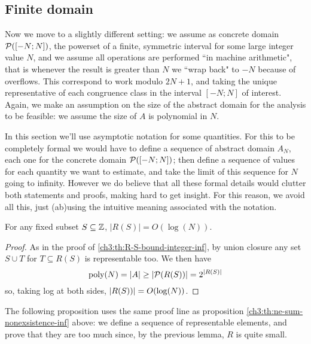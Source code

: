\subsection{Finite domain}
Now we move to a slightly different setting: we assume as concrete domain $\mathcal{P}([-N; N])$, the powerset of a finite, symmetric interval for some large integer value $N$, and we assume all operations are performed ``in machine arithmetic", that is whenever the result is greater than $N$ we ``wrap back" to $-N$ because of overflows. This correspond to work modulo $2N + 1$, and taking the unique representative of each congruence class in the interval $[-N; N]$ of interest.
Again, we make an assumption on the size of the abstract domain for the analysis to be feasible: we assume the size of $A$ is polynomial in $N$.

In this section we'll use asymptotic notation for some quantities. For this to be completely formal we would have to define a sequence of abstract domain $A_N$, each one for the concrete domain $\mathcal{P}([-N; N])$; then define a sequence of values for each quantity we want to estimate, and take the limit of this sequence for $N$ going to infinity. However we do believe that all these formal details would clutter both statements and proofs, making hard to get insight. For this reason, we avoid all this, just (ab)using the intuitive meaning associated with the notation.

\begin{lemma}\label{ch3:th:R-S-bound-integer-fin}
	For any fixed subset $S \subseteq \mathbb{Z}$, $\lvert R(S) \rvert = O(\log(N))$.
\end{lemma}
\begin{proof}
	As in the proof of \ref{ch3:th:R-S-bound-integer-inf}, by union closure any set $S \cup T$ for $T \subseteq R(S)$ is representable too. We then have
	\[
	\text{poly}(N) = \lvert A\rvert \ge \lvert\mathcal{P}(R(S))\rvert = 2^{\lvert R(S)\rvert} 
	\]
	so, taking log at both sides, $\lvert R(S))\rvert = O(\log(N))$.
\end{proof}

The following proposition uses the same proof line as proposition \ref{ch3:th:ne-sum-nonexsistence-inf} above: we define a sequence of representable elements, and prove that they are too much since, by the previous lemma, $R$ is quite small.

